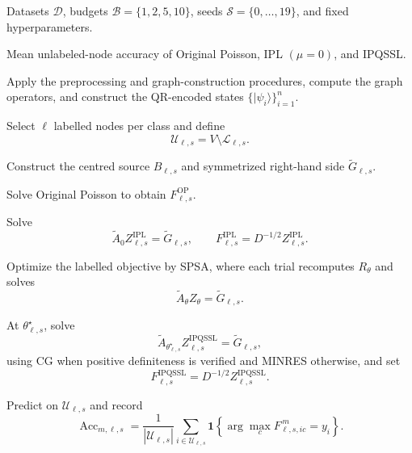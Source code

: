 \documentclass[11pt,a4paper]{article}
\begin{document}
\begin{algorithm}[H]
\caption{Low-Label Evaluation Protocol}
\label{alg:protocol}
\begin{algorithmic}[1]

\Require
Datasets \(\mathcal D\), budgets
\(\mathcal B=\{1,2,5,10\}\), seeds
\(\mathcal S=\{0,\ldots,19\}\), and fixed hyperparameters.

\Ensure
Mean unlabeled-node accuracy of Original Poisson,
IPL \((\mu=0)\), and \textsc{IPQSSL}.


    \State Apply the preprocessing and graph-construction procedures,
    compute the graph operators, and construct the QR-encoded states
    \(\{|\psi_i\rangle\}_{i=1}^{n}\).


            \State Select \(\ell\) labelled nodes per class and define
            \[
            \mathcal U_{\ell,s}
            =
            V\setminus\mathcal L_{\ell,s}.
            \]

            \State Construct the centred source \(B_{\ell,s}\) and
            symmetrized right-hand side \(\widetilde G_{\ell,s}\).

            \State Solve Original Poisson to obtain
            \(F^{\mathrm{OP}}_{\ell,s}\).

            \State Solve
            \[
            \widetilde A_0Z^{\mathrm{IPL}}_{\ell,s}
            =
            \widetilde G_{\ell,s},
            \qquad
            F^{\mathrm{IPL}}_{\ell,s}
            =
            D^{-1/2}Z^{\mathrm{IPL}}_{\ell,s}.
            \]

            \State Optimize the labelled objective by SPSA, where each
            trial recomputes \(R_\theta\) and solves
            \[
            \widetilde A_\theta Z_\theta
            =
            \widetilde G_{\ell,s}.
            \]

            \State At \(\theta^\star_{\ell,s}\), solve
            \[
            \widetilde A_{\theta^\star_{\ell,s}}
            Z^{\mathrm{IPQSSL}}_{\ell,s}
            =
            \widetilde G_{\ell,s},
            \]
            using CG when positive definiteness is verified and MINRES
            otherwise, and set
            \[
            F^{\mathrm{IPQSSL}}_{\ell,s}
            =
            D^{-1/2}Z^{\mathrm{IPQSSL}}_{\ell,s}.
            \]

                \State Predict on \(\mathcal U_{\ell,s}\) and record
                \[
                \operatorname{Acc}_{m,\ell,s}
                =
                \frac{1}{|\mathcal U_{\ell,s}|}
                \sum_{i\in\mathcal U_{\ell,s}}
                \mathbf 1
                \left\{
                \arg\max_c F_{\ell,s,ic}^{\,m}=y_i
                \right\}.
                \]
            \EndFor


\end{algorithmic}
\end{algorithm}
\end{document}
